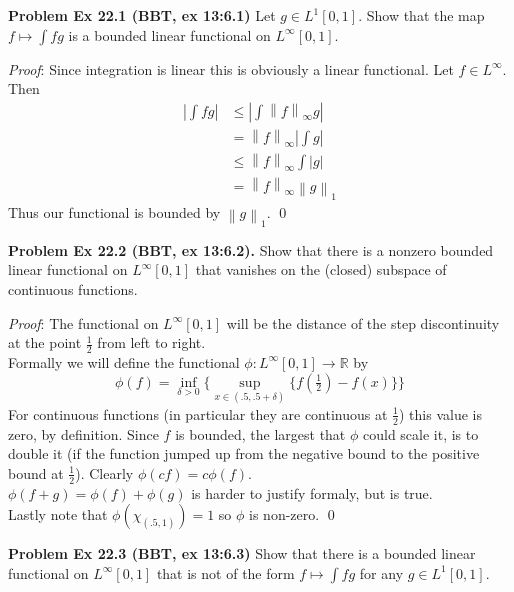 \documentclass[12pt]{article}
\newcommand{\problem}[1]{\hspace{-4 ex} \large \textbf{Problem #1} }
\newcommand{\norm}[1]{\left\lVert#1\right\rVert}
\renewenvironment{proof}{\hspace{-4 ex} \emph{Proof}:}{\qed}
\newcommand{\RR}{\mathbb{R}}
\begin{document}
\bigbreak
\problem{Ex 22.1 (BBT, ex 13:6.1)} Let $g\in L^1[0,1]$. Show that the map $f\mapsto\int fg$ is a bounded linear functional on $L^\infty[0,1]$.

	\begin{proof}
		Since integration is linear this is obviously a linear functional. Let $f \in L^\infty$. Then
		\begin{align*}
			\left \vert \int fg \right \vert & \leq \left \vert \int \norm{f}_\infty g \right \vert \\
			& = \norm{f}_\infty \left \vert \int g \right \vert  \\
			& \leq \norm{f}_\infty \int \vert g \vert \\
			& = \norm{f}_\infty \norm{g}_1
		\end{align*}
		Thus our functional is bounded by $\norm{g}_1$.
	\end{proof}

\bigbreak
\problem{Ex 22.2 (BBT, ex 13:6.2).} Show that there is a nonzero bounded linear functional on $L^\infty[0,1]$ that vanishes on the (closed) subspace of continuous functions. \bigbreak

	\begin{proof}
		The functional on $L^\infty [0, 1]$ will be the distance of the step discontinuity at the point $\tfrac{1}{2}$ from left to right. \\
		Formally we will define the functional $\phi: L^\infty [0, 1] \to \RR$ by
		$$
		\phi(f) = \inf_{\delta > 0} \Big \{ \sup_{x \in (.5, .5 + \delta)} \{ f(\tfrac{1}{2}) - f(x) \} \Big \}
		$$
		For continuous functions (in particular they are continuous at $\tfrac{1}{2}$) this value is zero, by definition. Since $f$ is bounded, the largest that $\phi$ could scale it, is to double it (if the function jumped up from the negative bound to the positive bound at $\tfrac{1}{2}$). Clearly $\phi(cf) = c\phi(f)$. \\
		$\phi(f + g) = \phi(f) + \phi(g)$ is harder to justify formaly, but is true. \\
		Lastly note that $\phi(\chi_{(.5,1)}) = 1$ so $\phi$ is non-zero.
	\end{proof}

\bigbreak
\problem{Ex 22.3 (BBT, ex 13:6.3)} Show that there is a bounded linear functional on $L^\infty[0,1]$ that is not of the form $f\mapsto\int fg$ for any $g\in L^1[0,1]$.
\end{document}
